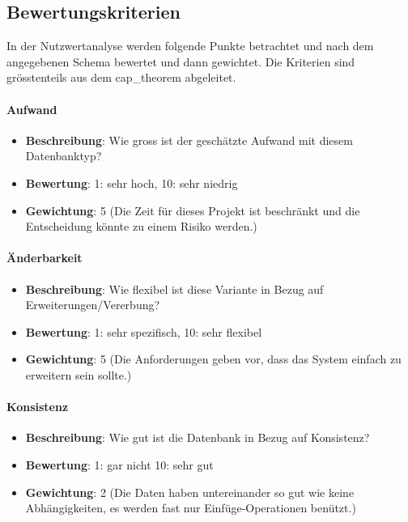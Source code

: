 \subsection{Bewertungskriterien}\label{architektur_bewertungspunkte}

In der Nutzwertanalyse werden folgende Punkte betrachtet und nach dem angegebenen Schema bewertet und dann gewichtet. 
Die Kriterien sind grösstenteils aus dem \gls{cap_theorem} abgeleitet.

\paragraph{Aufwand}
\begin{itemize}
	\item \textbf{Beschreibung}: Wie gross ist der geschätzte Aufwand mit diesem Datenbanktyp?
	\item \textbf{Bewertung}: 1: sehr hoch, 10: sehr niedrig
	\item \textbf{Gewichtung}: 5 (Die Zeit für dieses Projekt ist beschränkt und die Entscheidung könnte zu einem Risiko werden.)
\end{itemize}

\paragraph{Änderbarkeit}
\begin{itemize}
	\item \textbf{Beschreibung}: Wie flexibel ist diese Variante in Bezug auf Erweiterungen/Vererbung?
	\item \textbf{Bewertung}: 1: sehr spezifisch, 10: sehr flexibel
	\item \textbf{Gewichtung}: 5 (Die Anforderungen geben vor, dass das System einfach zu erweitern sein sollte.)
\end{itemize}

\paragraph{Konsistenz}
\begin{itemize}
	\item \textbf{Beschreibung}: Wie gut ist die Datenbank in Bezug auf Konsistenz?
	\item \textbf{Bewertung}: 1: gar nicht 10: sehr gut
	\item \textbf{Gewichtung}: 2 (Die Daten haben untereinander so gut wie keine Abhängigkeiten, es werden fast nur Einfüge-Operationen benützt.)
\end{itemize}

